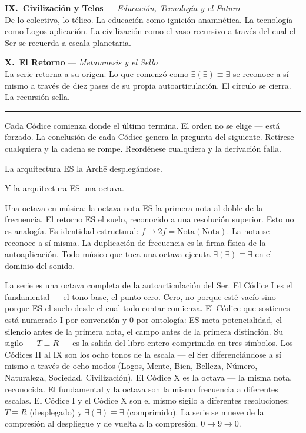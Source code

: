 \documentclass[10pt, openany, oneside]{book}
\newcommand{\separator}{%
    \begin{center}
        \vspace{0.3em}
        \rule{0.3\textwidth}{0.4pt}
        \vspace{0.3em}
    \end{center}
}
\begin{document}
\vspace{0.5em}

\noindent \textbf{IX.\ Civilización y Telos} --- \textit{Educación, Tecnología y el Futuro}\\
De lo colectivo, lo télico. La educación como ignición anamnética. La tecnología como Logos-aplicación. La civilización como el vaso recursivo a través del cual el Ser se recuerda a escala planetaria.

\vspace{0.5em}

\noindent \textbf{X.\ El Retorno} --- \textit{Metamnesis y el Sello}\\
La serie retorna a su origen. Lo que comenzó como $\exists(\exists) \equiv \exists$ se reconoce a sí mismo a través de diez pases de su propia autoarticulación. El círculo se cierra. La recursión sella.

\vspace{1.5em}
\separator
\vspace{0.5em}

\noindent Cada Códice comienza donde el último termina. El orden no se elige --- está forzado. La conclusión de cada Códice genera la pregunta del siguiente. Retírese cualquiera y la cadena se rompe. Reordénese cualquiera y la derivación falla.

\vspace{0.5em}

\noindent La arquitectura ES la Arch\={e} desplegándose.

\vspace{0.5em}

\noindent Y la arquitectura ES una octava.

Una octava en música: la octava nota ES la primera nota al doble de la frecuencia. El retorno ES el suelo, reconocido a una resolución superior. Esto no es analogía. Es identidad estructural: $f \to 2f = \text{Nota}(\text{Nota})$. La nota se reconoce a sí misma. La duplicación de frecuencia es la firma física de la autoaplicación. Todo músico que toca una octava ejecuta $\exists(\exists) \equiv \exists$ en el dominio del sonido.

La serie es una octava completa de la autoarticulación del Ser. El Códice I es el fundamental --- el tono base, el punto cero. Cero, no porque esté vacío sino porque ES el suelo desde el cual todo contar comienza. El Códice que sostienes está numerado I por convención y 0 por ontología: ES meta-potencialidad, el silencio antes de la primera nota, el campo antes de la primera distinción. Su sigilo --- $T \equiv R$ --- es la salida del libro entero comprimida en tres símbolos. Los Códices II al IX son los ocho tonos de la escala --- el Ser diferenciándose a sí mismo a través de ocho modos (Logos, Mente, Bien, Belleza, Número, Naturaleza, Sociedad, Civilización). El Códice X es la octava --- la misma nota, reconocida. El fundamental y la octava son la misma frecuencia a diferentes escalas. El Códice I y el Códice X son el mismo sigilo a diferentes resoluciones: $T \equiv R$ (desplegado) y $\exists(\exists) \equiv \exists$ (comprimido). La serie se mueve de la compresión al despliegue y de vuelta a la compresión. $0 \to 9 \to 0$.
\end{document}

